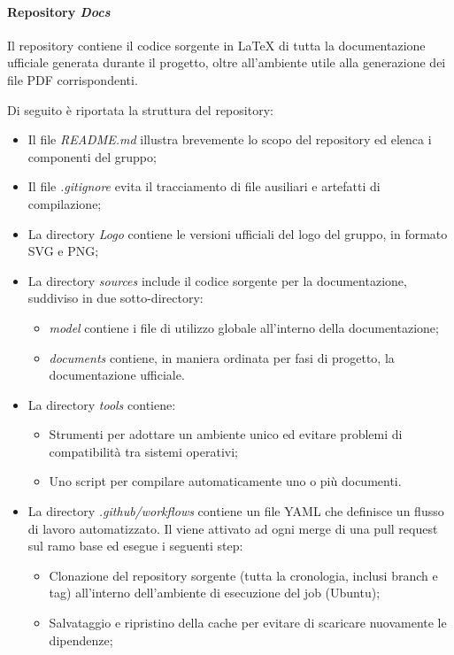 \paragraph{Repository \emph{Docs}}
Il repository contiene il codice sorgente in LaTeX di tutta la documentazione ufficiale generata durante il progetto, oltre all'ambiente utile alla generazione dei file PDF corrispondenti.\\
\par Di seguito è riportata la struttura del repository:
\begin{itemize}
  \item Il file \emph{README.md} illustra brevemente lo scopo del repository ed elenca i componenti del gruppo;
  \item Il file \emph{.gitignore} evita il tracciamento di file ausiliari e artefatti di compilazione;
  \item La directory \emph{Logo} contiene le versioni ufficiali del logo del gruppo, in formato SVG e PNG;
  \item La directory \emph{sources} include il codice sorgente per la documentazione, suddiviso in due sotto-directory:
  \begin{itemize}
    \item \emph{model} contiene i file di utilizzo globale all'interno della documentazione;
    \item \emph{documents} contiene, in maniera ordinata per fasi di progetto, la documentazione ufficiale.
  \end{itemize}
  \item La directory \emph{tools} contiene:
  \begin{itemize}
    \item Strumenti  per adottare un ambiente unico ed evitare problemi di compatibilità tra sistemi operativi;
    \item Uno script per compilare automaticamente uno o più documenti.
  \end{itemize}
  \item La directory \emph{.github/workflows} contiene un file YAML che definisce un flusso di lavoro automatizzato. Il  viene attivato ad ogni merge di una pull request sul ramo base ed esegue i seguenti step:
  \begin{itemize}
    \item Clonazione del repository sorgente (tutta la cronologia, inclusi branch e tag) all'interno dell'ambiente di esecuzione del job (Ubuntu);
    \item Salvataggio e ripristino della cache per evitare di scaricare nuovamente le dipendenze;

\end{itemize}
\end{itemize}
